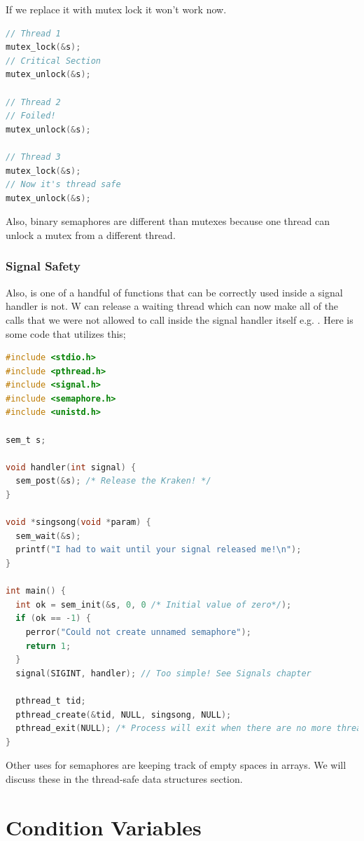 If we replace it with mutex lock it won't work now.

\begin{lstlisting}[language=C]
// Thread 1
mutex_lock(&s);
// Critical Section
mutex_unlock(&s);

// Thread 2
// Foiled!
mutex_unlock(&s);

// Thread 3
mutex_lock(&s);
// Now it's thread safe
mutex_unlock(&s);
\end{lstlisting}

Also, binary semaphores are different than mutexes because one thread can unlock a mutex from a different thread.

\subsubsection{Signal Safety}

Also,  is one of a handful of functions that can be correctly used inside a signal handler  is not.
W can release a waiting thread which can now make all of the calls that we were not allowed to call inside the signal handler itself e.g. .
Here is some code that utilizes this;

\begin{lstlisting}[language=C]
#include <stdio.h>
#include <pthread.h>
#include <signal.h>
#include <semaphore.h>
#include <unistd.h>

sem_t s;

void handler(int signal) {
  sem_post(&s); /* Release the Kraken! */
}

void *singsong(void *param) {
  sem_wait(&s);
  printf("I had to wait until your signal released me!\n");
}

int main() {
  int ok = sem_init(&s, 0, 0 /* Initial value of zero*/);
  if (ok == -1) {
    perror("Could not create unnamed semaphore");
    return 1;
  }
  signal(SIGINT, handler); // Too simple! See Signals chapter

  pthread_t tid;
  pthread_create(&tid, NULL, singsong, NULL);
  pthread_exit(NULL); /* Process will exit when there are no more threads */
}
\end{lstlisting}

Other uses for semaphores are keeping track of empty spaces in arrays.
We will discuss these in the thread-safe data structures section.

\section{Condition Variables}

